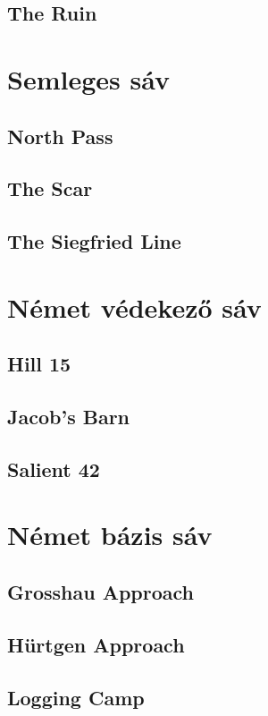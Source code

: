 \subsection{The Ruin}

\section{Semleges sáv}
\subsection{North Pass}

\subsection{The Scar}

\subsection{The Siegfried Line}

\section{Német védekező sáv}
\subsection{Hill 15}

\subsection{Jacob's Barn}

\subsection{Salient 42}

\section{Német bázis sáv}
\subsection{Grosshau Approach}

\subsection{Hürtgen Approach}

\subsection{Logging Camp}